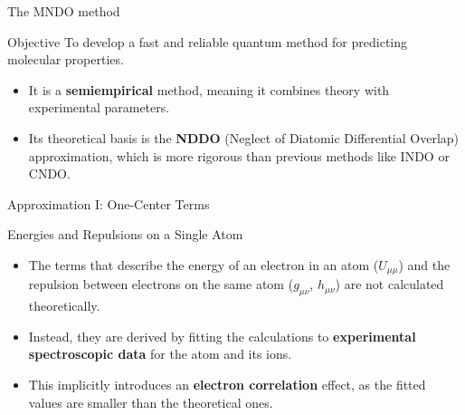 \begin{frame}{The MNDO method}
    \begin{block}{Objective}
        To develop a fast and reliable quantum method for predicting molecular properties.
    \end{block}
    \pause
    
    \begin{itemize}
        \item It is a \textbf{semiempirical} method, meaning it combines theory with experimental parameters.
        \pause
        \bigskip
        \item Its theoretical basis is the \textbf{NDDO} (Neglect of Diatomic Differential Overlap) approximation, which is more rigorous than previous methods like INDO or CNDO.
    \end{itemize}
\end{frame}



\begin{frame}{Approximation I: One-Center Terms}
    \begin{block}{Energies and Repulsions on a Single Atom}
        \begin{itemize}
            \item The terms that describe the energy of an electron in an atom ($U_{\mu\mu}$) and the repulsion between electrons on the same atom ($g_{\mu\nu}$, $h_{\mu\nu}$) are not calculated theoretically.
            \pause
            \bigskip
            \item Instead, they are derived by fitting the calculations to \textbf{experimental spectroscopic data} for the atom and its ions.
            \pause
            \bigskip
            \item This implicitly introduces an \textbf{electron correlation} effect, as the fitted values are smaller than the theoretical ones.
        \end{itemize}
    \end{block}
\end{frame}



